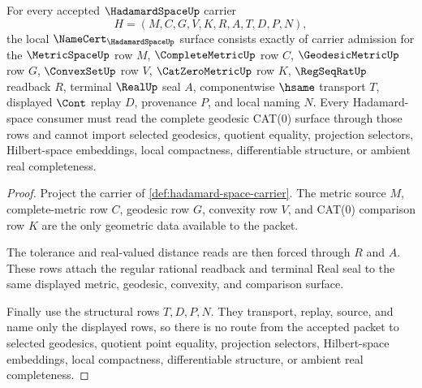 \begin{theorem}
\label{thm:hadamard-space-namecert-obligations}
For every accepted $\HadamardSpaceUp$ carrier
$$
H=(M,C,G,V,K,R,A,T,D,P,N),
$$
the local $\NameCert_{\HadamardSpaceUp}$ surface consists exactly of carrier admission for the $\MetricSpaceUp$ row $M$, $\CompleteMetricUp$ row $C$, $\GeodesicMetricUp$ row $G$, $\ConvexSetUp$ row $V$, $\CatZeroMetricUp$ row $K$, $\RegSeqRatUp$ readback $R$, terminal $\RealUp$ seal $A$, componentwise $\hsame$ transport $T$, displayed $\Cont$ replay $D$, provenance $P$, and local naming $N$. Every Hadamard-space consumer must read the complete geodesic CAT(0) surface through those rows and cannot import selected geodesics, quotient equality, projection selectors, Hilbert-space embeddings, local compactness, differentiable structure, or ambient real completeness.
\end{theorem}
\begin{proof}
Project the carrier of \autoref{def:hadamard-space-carrier}. The metric source $M$, complete-metric row $C$, geodesic row $G$, convexity row $V$, and CAT(0) comparison row $K$ are the only geometric data available to the packet.

The tolerance and real-valued distance reads are then forced through $R$ and $A$. These rows attach the regular rational readback and terminal Real seal to the same displayed metric, geodesic, convexity, and comparison surface.

Finally use the structural rows $T,D,P,N$. They transport, replay, source, and name only the displayed rows, so there is no route from the accepted packet to selected geodesics, quotient point equality, projection selectors, Hilbert-space embeddings, local compactness, differentiable structure, or ambient real completeness.
\end{proof}



